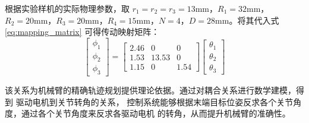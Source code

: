 根据实验样机的实际物理参数，取 $r_1=r_2=r_3=13\text{mm}$，$R_1=32\text{mm}$，$R_2=20\text{mm}$，$R_3=20\text{mm}$，$R_4=15\text{mm}$，$N=4$，$D=28\text{mm}$。将其代入式 \ref{eq:mapping_matrix} 可得传动映射矩阵：
\begin{equation}
\begin{bmatrix} \phi_1 \\ \phi_2 \\ \phi_3 \end{bmatrix} = 
\begin{bmatrix} 
2.46 & 0 & 0 \\
1.53 & 13.53 & 0 \\
1.15 & 0 & 1.54
\end{bmatrix}
\begin{bmatrix} \theta_1 \\ \theta_2 \\ \theta_3 \end{bmatrix}
\end{equation}

该关系为机械臂的精确轨迹规划提供理论依据。通过对耦合关系进行数学建模，得到
驱动电机到关节转角的关系，
控制系统能够根据末端目标位姿反求各个关节角度，通过各个关节角度来反求各驱动电机
的转角，从而提升机械臂的准确性。

